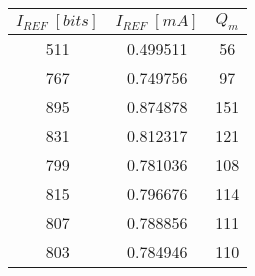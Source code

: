 \begin{tabular}{ccc}
\toprule
$I_{REF} \; [bits]$ & $I_{REF} \; [mA]$ & $Q_m$ \\
\midrule
                511 &          0.499511 &    56 \\
                767 &          0.749756 &    97 \\
                895 &          0.874878 &   151 \\
                831 &          0.812317 &   121 \\
                799 &          0.781036 &   108 \\
                815 &          0.796676 &   114 \\
                807 &          0.788856 &   111 \\
                803 &          0.784946 &   110 \\
\bottomrule
\end{tabular}
